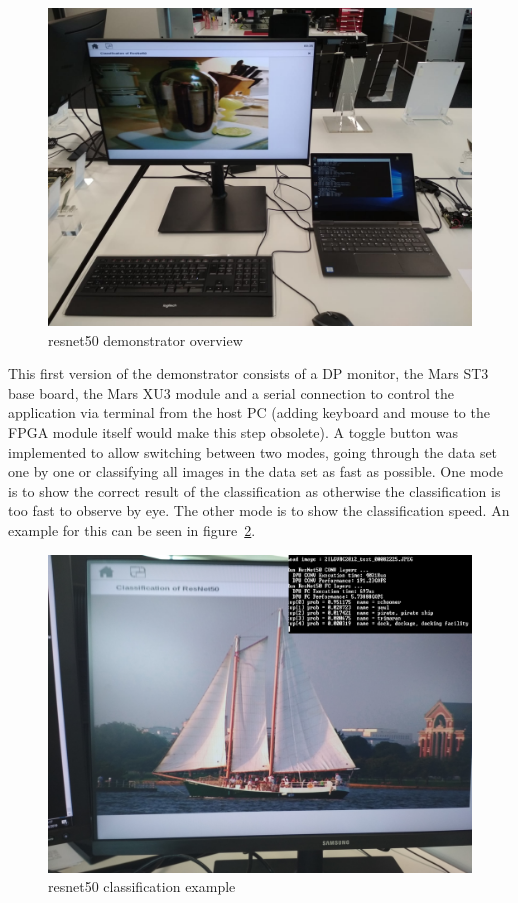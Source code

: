 \begin{figure}[!htb]
	\centering
		\includegraphics[width=\textwidth]{bilder/resnet_overview.jpg}
		\caption{resnet50 demonstrator overview}
		\label{fig:st3_demo_resnet}
\end{figure}
This first version of the demonstrator consists of a \ac{DP} monitor, the Mars ST3 base board, the Mars XU3 module and a serial connection to control the application via terminal from the host PC (adding keyboard and mouse to the \ac{FPGA} module itself would make this step obsolete).
A toggle button was implemented to allow switching between two modes, going through the data set one by one or classifying all images in the data set as fast as possible. One mode is to show the correct result of the classification as otherwise the classification is too fast to observe by eye. The other mode is to show the classification speed. An example for this can be seen in figure~\ref{fig:resnet_classification}.
\begin{figure}[!htb]
	\centering
		\includegraphics[width=\textwidth]{bilder/resnet50_example.jpg}
		\caption{resnet50 classification example}
		\label{fig:resnet_classification}
\end{figure}

